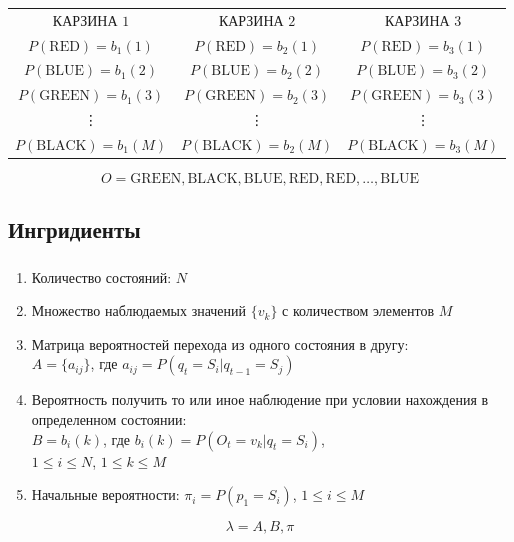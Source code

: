 \documentclass{beamer}
\begin{document}
\begin{frame} 
  \frametitle{\insertsection}
  \framesubtitle{\insertsubsection}

  \begin{table}
    \begin{tabular}{ccc}
      КАРЗИНА $1$ & КАРЗИНА $2$ & КАРЗИНА $3$ \\
      $P(\text{RED}) = b_1(1)$ & $P(\text{RED}) = b_2(1)$ & $P(\text{RED}) = b_3(1)$ \\
      $P(\text{BLUE}) = b_1(2)$ & $P(\text{BLUE}) = b_2(2)$ & $P(\text{BLUE}) = b_3(2)$ \\
      $P(\text{GREEN}) = b_1(3)$ & $P(\text{GREEN}) = b_2(3)$ & $P(\text{GREEN}) = b_3(3)$ \\
      \vdots & \vdots & \vdots \\
      $P(\text{BLACK}) = b_1(M)$ & $P(\text{BLACK}) = b_2(M)$ & $P(\text{BLACK}) = b_3(M)$ \\ 
    \end{tabular}
  \end{table}
  
  \begin{equation*}
  O = \text{GREEN},  \text{BLACK}, \text{BLUE}, \text{RED}, \text{RED}, \ldots, \text{BLUE}    
  \end{equation*}

\end{frame}

\subsection{Ингридиенты}

\begin{frame} 
  \frametitle{\insertsection}
  \framesubtitle{\insertsubsection}
  \begin{enumerate}
  \item Количество состояний: $N$ \pause
  \item Множество наблюдаемых значений $\{v_k\}$ с количеством элементов $M$ \pause
  \item Матрица вероятностей перехода из одного состояния в другу: \\
    $A = \{a_{ij}\}$, где $a_{ij} = P(q_t = S_i | q_{t - 1} = S_j)$ \pause
  \item Вероятность получить то или иное наблюдение при условии нахождения в определенном состоянии: \\
    $B = {b_i(k)}$, где $b_i(k) = P(O_t = v_k | q_t = S_i)$, \\
    $1 \le i \le N$, $1 \le k \le M$ \pause
    \item Начальные вероятности: $\pi_i = P(p_1 = S_i)$, $1 \le i \le M$
  \end{enumerate}

  \pause
  \begin{equation*}
    \lambda = {A, B, \pi}
  \end{equation*}

\end{frame}
\end{document}
